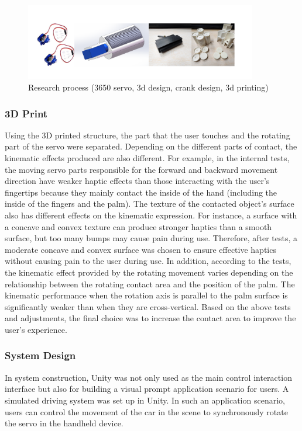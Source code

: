 \begin{figure}[h]
\centering
\includegraphics[width=0.9\textwidth]{A_thesis/figures/029.png}
\caption{Research process (3650 servo, 3d design, crank design, 3d printing)}
\end{figure}

\subsubsection{3D Print}
Using the 3D printed structure, the part that the user touches and the rotating part of the servo were separated. Depending on the different parts of contact, the kinematic effects produced are also different. For example, in the internal tests, the moving servo parts responsible for the forward and backward movement direction have weaker haptic effects than those interacting with the user's fingertips because they mainly contact the inside of the hand (including the inside of the fingers and the palm). The texture of the contacted object's surface also has different effects on the kinematic expression. For instance, a surface with a concave and convex texture can produce stronger haptics than a smooth surface, but too many bumps may cause pain during use. Therefore, after tests, a moderate concave and convex surface was chosen to ensure effective haptics without causing pain to the user during use.
In addition, according to the tests, the kinematic effect provided by the rotating movement varies depending on the relationship between the rotating contact area and the position of the palm. The kinematic performance when the rotation axis is parallel to the palm surface is significantly weaker than when they are cross-vertical. Based on the above tests and adjustments, the final choice was to increase the contact area to improve the user's experience.

\subsubsection{System Design}
In system construction, Unity was not only used as the main control interaction interface but also for building a visual prompt application scenario for users. A simulated driving system was set up in Unity. In such an application scenario, users can control the movement of the car in the scene to synchronously rotate the servo in the handheld device.

